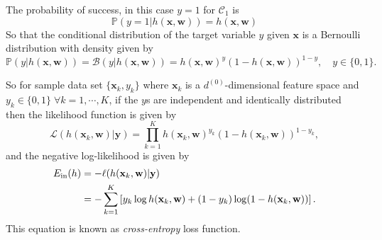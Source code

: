 The probability of success, in this case $y=1$ for $\mathcal{C}_1$ is 
$$
\mathbb{P}(y=1|h(\mathbf{x},\mathbf{w}))=h(\mathbf{x},\mathbf{w})
$$
So that the conditional distribution of the target variable $y$ given $\mathbf{x}$ is a Bernoulli distribution with density given by
$$
\mathbb{P}(y|h(\mathbf{x},\mathbf{w}))=\mathcal{B}(y|h(\mathbf{x},\mathbf{w}))=h(\mathbf{x},\mathbf{w})^{y}(1-h(\mathbf{x},\mathbf{w}))^{1-y},\quad y\in\{0,1\}.
$$

So for sample data set $\{\mathbf{x}_k,y_k\}$ where $\mathbf{x}_k$ is a $d^{(0)}$-dimensional feature space and $y_k\in\{0,1\}\;\forall k=1,\cdots, K$, if the $y$s are independent and identically distributed then the likelihood function is given by
$$
\mathcal{L}(h(\mathbf{x}_k,\mathbf{w})|\mathbf{y})=\prod_{k=1}^{K}h(\mathbf{x}_k,\mathbf{w})^{y_k}(1-h(\mathbf{x}_k,\mathbf{w}))^{1-y_k},
$$
and the negative log-likelihood is given by 
\begin{align}
E_{\mathrm{in}}(h)&=-\ell (h(\mathbf{x}_k,\mathbf{w})|\mathbf{y})\nonumber\\
&=-\sum_{k=1}^{K}\left[y_k\log h(\mathbf{x}_k,\mathbf{w})+(1-y_k)\log(1-h(\mathbf{x}_k,\mathbf{w}))\right].\label{eq:logitein}
\end{align}
This equation is known as \textit{cross-entropy} loss function. 
